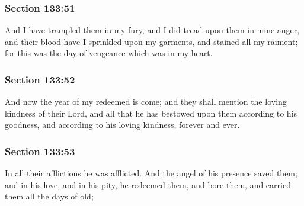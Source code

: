 	\subsubsection{Section 133:51} %
		\label{DC133-51}

		And I have trampled them in my fury, and I did tread upon them in mine anger, and their blood have I sprinkled upon my garments, and stained all my raiment; for this was the day of vengeance which was in my heart.


	\subsubsection{Section 133:52} %
		\label{DC133-52}

		And now the year of my redeemed is come; and they shall mention the loving kindness of their Lord, and all that he has bestowed upon them according to his goodness, and according to his loving kindness, forever and ever.


	\subsubsection{Section 133:53} %
		\label{DC133-53}

		In all their afflictions he was afflicted.  And the angel of his presence saved them; and in his love, and in his pity, he redeemed them, and bore them, and carried them all the days of old;


